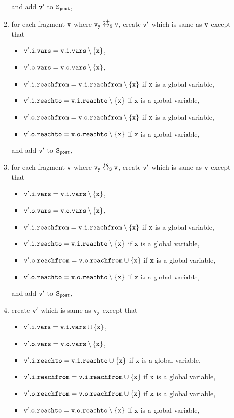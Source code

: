 \begin{itemize}
\begin{enumerate}
\begin{itemize}
\end{itemize}
and add $\tt v'$ to $\tt S_{post}$,
\item for each fragment $\tt v$ where $\tt v_y \overset{*+}\leftrightarrow_S v$, create $\tt v'$ which is same as $\tt v$ except that
\begin{itemize}
\item $\tt v'.i.vars = v.i.vars \setminus \{x\}$,
\item $\tt v'.o.vars = v.o.vars \setminus \{x\}$,
\item $\tt v'.i.reachfrom = v.i.reachfrom \setminus \{x\}$ if $\tt x$ is a global variable,
\item $\tt v'.i.reachto = v.i.reachto \setminus \{x\}$ if $\tt x$ is a global variable,
\item $\tt v'.o.reachfrom = v.o.reachfrom \setminus \{x\}$ if $\tt x$ is a global variable,
\item $\tt v'.o.reachto = v.o.reachto \setminus \{x\}$ if $\tt x$ is a global variable,
\end{itemize}
and add $\tt v'$ to $\tt S_{post}$,
\item for each fragment $\tt v$ where $\tt v_y \overset{*o}\leftrightarrow_S v$, create $\tt v'$ which is same as $\tt v$ except that
\begin{itemize}
\item $\tt v'.i.vars = v.i.vars \setminus \{x\}$,
\item $\tt v'.o.vars = v.o.vars \setminus \{x\}$,
\item $\tt v'.i.reachfrom = v.i.reachfrom \setminus \{x\}$ if $\tt x$ is a global variable,
\item $\tt v'.i.reachto = v.i.reachto \setminus \{x\}$ if $\tt x$ is a global variable,
\item $\tt v'.o.reachfrom = v.o.reachfrom \cup \{x\}$ if $\tt x$ is a global variable,
\item $\tt v'.o.reachto = v.o.reachto \setminus \{x\}$ if $\tt x$ is a global variable,

\end{itemize}
and add $\tt v'$ to $\tt S_{post}$,
\item create $\tt v'$ which is same as $\tt v_y$ except that
\begin{itemize}
\item $\tt v'.i.vars = v.i.vars \cup \{x\}$,
\item $\tt v'.o.vars = v.o.vars \setminus \{x\}$,
\item $\tt v'.i.reachto = v.i.reachto \cup \{x\}$ if $\tt x$ is a global variable,
 \item $\tt v'.i.reachfrom = v.i.reachfrom \cup \{x\}$ if $\tt x$ is a global variable,
\item $\tt v'.o.reachfrom = v.o.reachfrom \cup \{x\}$ if $\tt x$ is a global variable,
\item $\tt v'.o.reachto = v.o.reachto \setminus \{x\}$ if $\tt x$ is a global variable,


\end{itemize}
\end{enumerate}
\end{itemize}
